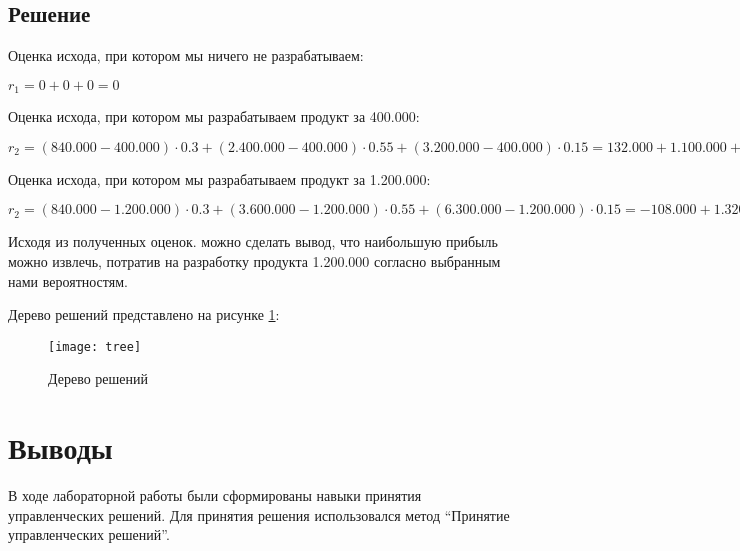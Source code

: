 \documentclass[a4paper,14pt]{extarticle}
\begin{document}
\subsection{Решение}
Оценка исхода, при котором мы ничего не разрабатываем:

$ r_1 = 0 + 0 + 0 = 0 $

Оценка исхода, при котором мы разрабатываем продукт за 400.000:

$ r_2 = (840.000-400.000) \cdot 0.3 + (2.400.000-400.000) \cdot 0.55 + (3.200.000-400.000) \cdot 0.15 = 132.000 + 1.100.000 + 420.000 = 1.652.000 $

Оценка исхода, при котором мы разрабатываем продукт за 1.200.000:

$ r_2 = (840.000-1.200.000) \cdot 0.3 + (3.600.000-1.200.000) \cdot 0.55 + (6.300.000-1.200.000) \cdot 0.15 = -108.000 + 1.320.000 + 765.000 = 1.977.000 $

Исходя из полученных оценок. можно сделать вывод, что наибольшую прибыль можно
извлечь, потратив на разработку продукта 1.200.000 согласно выбранным нами
вероятностям.

Дерево решений представлено на рисунке \ref{fig:tree}:

\begin{figure}[H]
    \centering
    \texttt{[image: tree]}
    \caption{Дерево решений}
    \label{fig:tree}
\end{figure}

\section*{Выводы}
В ходе лабораторной работы были сформированы навыки принятия управленческих
решений. Для принятия решения использовался метод \enquote{Принятие\\
управленческих решений}.
\end{document}

